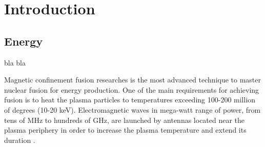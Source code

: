 \setchapterpreamble[u]{\margintoc}
\chapter{Introduction}

\section{Energy}
bla bla


Magnetic confinement fusion researches is the most advanced technique to master nuclear fusion for energy production. One of the main requirements for achieving fusion is to heat the plasma particles to temperatures exceeding 100-200 million of degrees (10-20 keV). Electromagnetic waves in mega-watt range of power, from tens of MHz to hundreds of GHz, are launched by antennas located near the plasma periphery in order to increase the plasma temperature and extend its duration . 
